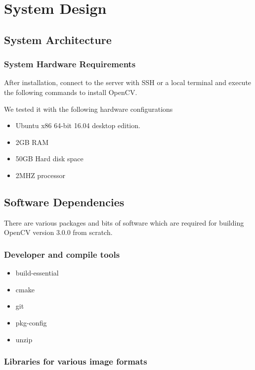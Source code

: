 \documentclass[BTech]{srmuthesis}
\begin{document}
\chapter{System Design}

\section{System Architecture}

\subsection{System Hardware Requirements}

After installation, connect to the server with SSH or a local terminal and execute the following commands to install OpenCV.

We tested it with the following hardware configurations

\begin{itemize}
    \item Ubuntu x86 64-bit 16.04 desktop edition.
    \item 2GB RAM
    \item 50GB Hard disk space
    \item 2MHZ processor
\end{itemize}

\section{Software Dependencies}

There are various packages and bits of software which are required for building OpenCV version 3.0.0 from scratch.

\subsection{Developer and compile tools}

\begin{itemize}
    \item build-essential
    \item cmake
    \item git
    \item pkg-config
    \item unzip
\end{itemize}

\subsection{Libraries for various image formats}
\end{document}
